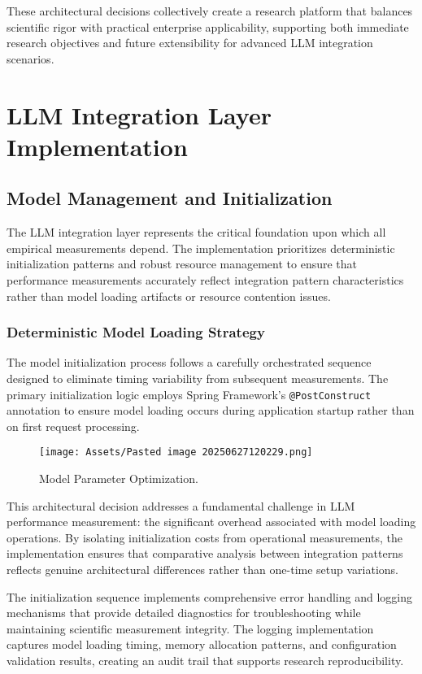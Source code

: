 These architectural decisions collectively create a research platform that balances scientific rigor with practical enterprise applicability, supporting both immediate research objectives and future extensibility for advanced LLM integration scenarios.



\chapter{LLM Integration Layer Implementation}

\section{Model Management and Initialization}

The LLM integration layer represents the critical foundation upon which all empirical measurements depend. The implementation prioritizes deterministic initialization patterns and robust resource management to ensure that performance measurements accurately reflect integration pattern characteristics rather than model loading artifacts or resource contention issues.

\subsection{Deterministic Model Loading Strategy}

The model initialization process follows a carefully orchestrated sequence designed to eliminate timing variability from subsequent measurements. The primary initialization logic employs Spring Framework's \texttt{@PostConstruct} annotation to ensure model loading occurs during application startup rather than on first request processing.

\begin{figure}[H]
    \centering
    \texttt{[image: Assets/Pasted image 20250627120229.png]}
    \caption{Model Parameter Optimization. \cite{PhiModel}}
\end{figure}
This architectural decision addresses a fundamental challenge in LLM performance measurement: the significant overhead associated with model loading operations. By isolating initialization costs from operational measurements, the implementation ensures that comparative analysis between integration patterns reflects genuine architectural differences rather than one-time setup variations.

The initialization sequence implements comprehensive error handling and logging mechanisms that provide detailed diagnostics for troubleshooting while maintaining scientific measurement integrity. The logging implementation captures model loading timing, memory allocation patterns, and configuration validation results, creating an audit trail that supports research reproducibility.

